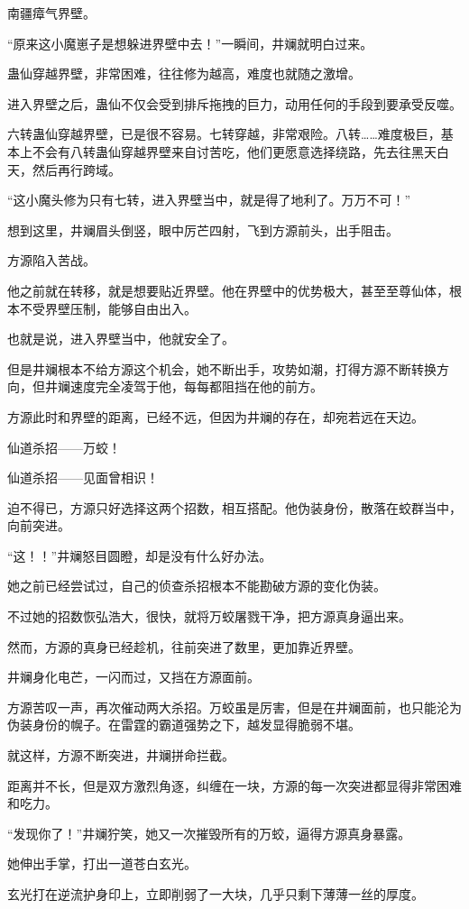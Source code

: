 \begin{this_body}
南疆瘴气界壁。

“原来这小魔崽子是想躲进界壁中去！”一瞬间，井斓就明白过来。

蛊仙穿越界壁，非常困难，往往修为越高，难度也就随之激增。

进入界壁之后，蛊仙不仅会受到排斥拖拽的巨力，动用任何的手段到要承受反噬。

六转蛊仙穿越界壁，已是很不容易。七转穿越，非常艰险。八转……难度极巨，基本上不会有八转蛊仙穿越界壁来自讨苦吃，他们更愿意选择绕路，先去往黑天白天，然后再行跨域。

“这小魔头修为只有七转，进入界壁当中，就是得了地利了。万万不可！”

想到这里，井斓眉头倒竖，眼中厉芒四射，飞到方源前头，出手阻击。

方源陷入苦战。

他之前就在转移，就是想要贴近界壁。他在界壁中的优势极大，甚至至尊仙体，根本不受界壁压制，能够自由出入。

也就是说，进入界壁当中，他就安全了。

但是井斓根本不给方源这个机会，她不断出手，攻势如潮，打得方源不断转换方向，但井斓速度完全凌驾于他，每每都阻挡在他的前方。

方源此时和界壁的距离，已经不远，但因为井斓的存在，却宛若远在天边。

仙道杀招——万蛟！

仙道杀招——见面曾相识！

迫不得已，方源只好选择这两个招数，相互搭配。他伪装身份，散落在蛟群当中，向前突进。

“这！！”井斓怒目圆瞪，却是没有什么好办法。

她之前已经尝试过，自己的侦查杀招根本不能勘破方源的变化伪装。

不过她的招数恢弘浩大，很快，就将万蛟屠戮干净，把方源真身逼出来。

然而，方源的真身已经趁机，往前突进了数里，更加靠近界壁。

井斓身化电芒，一闪而过，又挡在方源面前。

方源苦叹一声，再次催动两大杀招。万蛟虽是厉害，但是在井斓面前，也只能沦为伪装身份的幌子。在雷霆的霸道强势之下，越发显得脆弱不堪。

就这样，方源不断突进，井斓拼命拦截。

距离并不长，但是双方激烈角逐，纠缠在一块，方源的每一次突进都显得非常困难和吃力。

“发现你了！”井斓狞笑，她又一次摧毁所有的万蛟，逼得方源真身暴露。

她伸出手掌，打出一道苍白玄光。

玄光打在逆流护身印上，立即削弱了一大块，几乎只剩下薄薄一丝的厚度。


\end{this_body}
